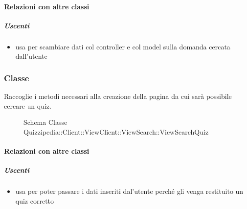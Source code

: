 \paragraph{Relazioni con altre classi}
\subparagraph{Uscenti}
\begin{itemize}
\item usa  per scambiare dati col controller e col model sulla domanda cercata dall'utente
\end{itemize}
\subsubsection{Classe }
Raccoglie i metodi necessari alla creazione della pagina da cui sarà possibile cercare un quiz.
\begin{figure}[H]
\centering
\noindent{}
\caption[Schema Classe ViewSearchQuiz]{Schema Classe Quizzipedia::Client::ViewClient::ViewSearch::ViewSearchQuiz}
\end{figure}
\paragraph{Relazioni con altre classi}
\subparagraph{Uscenti}
\begin{itemize}
\item usa  per poter passare i dati inseriti dal'utente perché gli venga restituito un quiz corretto
\end{itemize}
